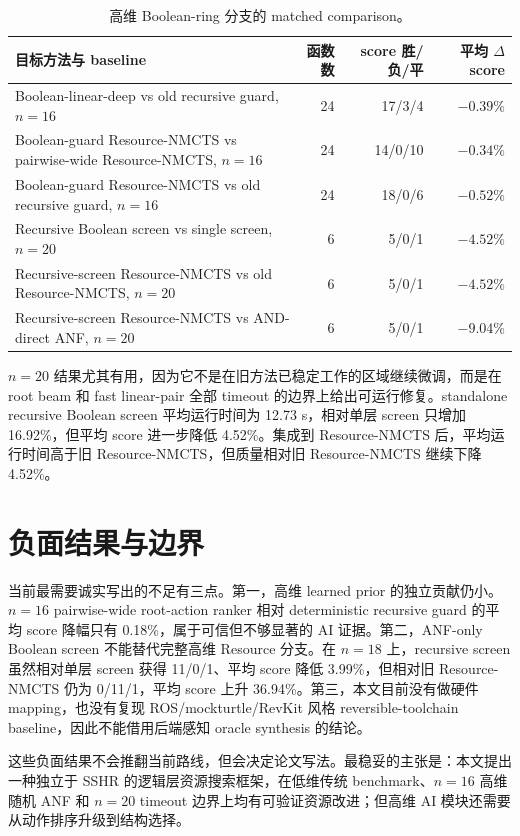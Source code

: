 \documentclass[UTF8,fontset=macnew,11pt]{ctexart}
\newcommand{\method}{Resource-NMCTS}
\begin{document}
\begin{table}[t]
\centering
\small
\caption{高维 Boolean-ring 分支的 matched comparison。}
\label{tab:highdim}
\begin{tabularx}{\linewidth}{>{\raggedright\arraybackslash}Xrrr}
\toprule
目标方法与 baseline & 函数数 & score 胜/负/平 & 平均 $\Delta$ score \\
\midrule
Boolean-linear-deep vs old recursive guard, $n=16$ & 24 & 17/3/4 & $-0.39\%$ \\
Boolean-guard \method{} vs pairwise-wide \method{}, $n=16$ & 24 & 14/0/10 & $-0.34\%$ \\
Boolean-guard \method{} vs old recursive guard, $n=16$ & 24 & 18/0/6 & $-0.52\%$ \\
Recursive Boolean screen vs single screen, $n=20$ & 6 & 5/0/1 & $-4.52\%$ \\
Recursive-screen \method{} vs old \method{}, $n=20$ & 6 & 5/0/1 & $-4.52\%$ \\
Recursive-screen \method{} vs AND-direct ANF, $n=20$ & 6 & 5/0/1 & $-9.04\%$ \\
\bottomrule
\end{tabularx}
\end{table}

$n=20$ 结果尤其有用，因为它不是在旧方法已稳定工作的区域继续微调，而是在 root beam 和 fast linear-pair 全部 timeout 的边界上给出可运行修复。standalone recursive Boolean screen 平均运行时间为 12.73 s，相对单层 screen 只增加 16.92\%，但平均 score 进一步降低 4.52\%。集成到 \method{} 后，平均运行时间高于旧 \method{}，但质量相对旧 \method{} 继续下降 4.52\%。

\section{负面结果与边界}

当前最需要诚实写出的不足有三点。第一，高维 learned prior 的独立贡献仍小。$n=16$ pairwise-wide root-action ranker 相对 deterministic recursive guard 的平均 score 降幅只有 0.18\%，属于可信但不够显著的 AI 证据。第二，ANF-only Boolean screen 不能替代完整高维 Resource 分支。在 $n=18$ 上，recursive screen 虽然相对单层 screen 获得 11/0/1、平均 score 降低 3.99\%，但相对旧 \method{} 仍为 0/11/1，平均 score 上升 36.94\%。第三，本文目前没有做硬件 mapping，也没有复现 ROS/mockturtle/RevKit 风格 reversible-toolchain baseline，因此不能借用后端感知 oracle synthesis 的结论\cite{meuli2020ros,yu2025backend}。

这些负面结果不会推翻当前路线，但会决定论文写法。最稳妥的主张是：本文提出一种独立于 SSHR 的逻辑层资源搜索框架，在低维传统 benchmark、$n=16$ 高维随机 ANF 和 $n=20$ timeout 边界上均有可验证资源改进；但高维 AI 模块还需要从动作排序升级到结构选择。
\end{document}

